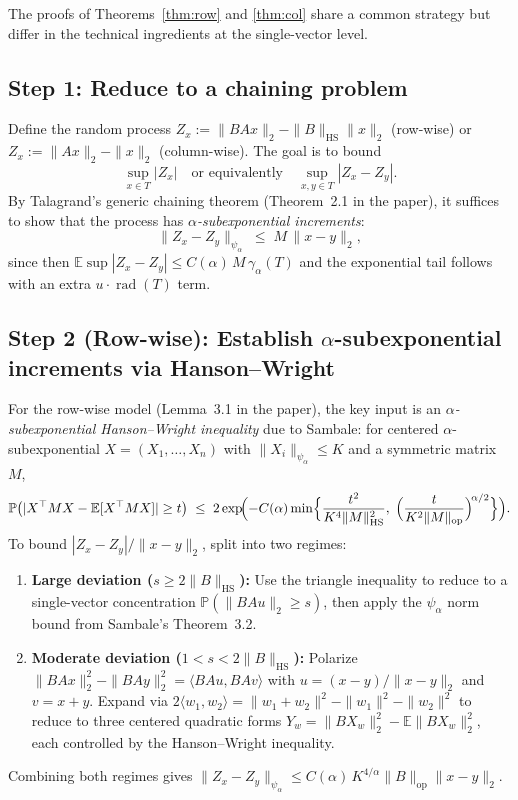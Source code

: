\documentclass[11pt,a4paper]{article}
\begin{document}
The proofs of Theorems~\ref{thm:row} and \ref{thm:col} share a common strategy but differ in the technical ingredients at the single-vector level.

\subsection*{Step 1: Reduce to a chaining problem}

Define the random process $Z_x := \|BAx\|_2 - \|B\|_{\mathrm{HS}}\|x\|_2$ (row-wise) or $Z_x := \|Ax\|_2-\|x\|_2$ (column-wise). The goal is to bound
\[
  \sup_{x\in T}|Z_x| \quad\text{or equivalently}\quad \sup_{x,y\in T}|Z_x - Z_y|.
\]
By Talagrand's generic chaining theorem (Theorem~2.1 in the paper), it suffices to show that the process has \emph{$\alpha$-subexponential increments}:
\[
  \|Z_x - Z_y\|_{\psi_\alpha} \;\le\; M\,\|x-y\|_2,
\]
since then $\mathbb{E}\sup|Z_x-Z_y|\le C(\alpha)\,M\,\gamma_\alpha(T)$ and the exponential tail follows with an extra $u\cdot\operatorname{rad}(T)$ term.

\subsection*{Step 2 (Row-wise): Establish $\alpha$-subexponential increments via Hanson--Wright}

For the row-wise model (Lemma~3.1 in the paper), the key input is an \emph{$\alpha$-subexponential Hanson--Wright inequality} due to Sambale: for centered $\alpha$-subexponential $X=(X_1,\dots,X_n)$ with $\|X_i\|_{\psi_\alpha}\le K$ and a symmetric matrix $M$,
\[
  \mathbb{P}\bigl(|X^\top M X - \mathbb{E}[X^\top M X]|\ge t\bigr)
  \;\le\; 2\exp\!\Bigl(-C(\alpha)\min\Bigl\{\frac{t^2}{K^4\|M\|_{\mathrm{HS}}^2},\;\Bigl(\frac{t}{K^2\|M\|_{\mathrm{op}}}\Bigr)^{\!\alpha/2}\Bigr\}\Bigr).
\]
To bound $|Z_x - Z_y|/\|x-y\|_2$, split into two regimes:
\begin{enumerate}[leftmargin=*]
  \item \textbf{Large deviation ($s\ge 2\|B\|_{\mathrm{HS}}$):} Use the triangle inequality to reduce to a single-vector concentration $\mathbb{P}(\|BAu\|_2\ge s)$, then apply the $\psi_\alpha$ norm bound from Sambale's Theorem~3.2.
  \item \textbf{Moderate deviation ($1<s<2\|B\|_{\mathrm{HS}}$):} Polarize $\|BAx\|_2^2-\|BAy\|_2^2 = \langle BAu, BAv\rangle$ with $u=(x-y)/\|x-y\|_2$ and $v=x+y$. Expand via $2\langle w_1,w_2\rangle = \|w_1+w_2\|^2-\|w_1\|^2-\|w_2\|^2$ to reduce to three centered quadratic forms $Y_w=\|BX_w\|_2^2-\mathbb{E}\|BX_w\|_2^2$, each controlled by the Hanson--Wright inequality.
\end{enumerate}
Combining both regimes gives $\|Z_x-Z_y\|_{\psi_\alpha}\le C(\alpha)\,K^{4/\alpha}\|B\|_{\mathrm{op}}\|x-y\|_2$.
\end{document}
